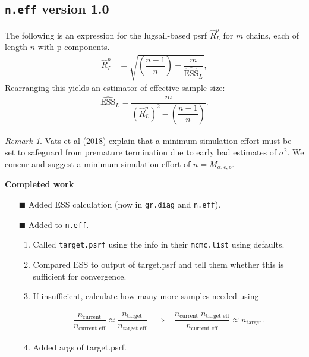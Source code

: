 \documentclass[12pt]{article}
\theoremstyle{remark}
\newtheorem{remark}{Remark}
\begin{document}
\subsection{\texttt{n.eff} version 1.0}

The following is an expression for the lugsail-based psrf $\hat{R}^p_L$ for $m$  chains, each of length $n$ with  p components.
\begin{align*}
	\hat{R}^p_L &= \sqrt{ \left(\dfrac{n-1}{n} \right) + \dfrac{m}{\widehat{\text{ESS}}_L}},
\end{align*}
Rearranging this yields an estimator of effective sample size:
\begin{align*}
\widehat{\text{ESS}}_L = \dfrac{m}{\left( \hat{R}^p_L \right)^2 -  \left(\dfrac{n-1}{n} \right)}.
\end{align*}

\begin{remark}
	\label{rem:minimum_effort}
Vats et al (2018) explain that a minimum simulation effort must be set to safeguard from premature termination due to early bad estimates of $\sigma^2$. We concur and  suggest  a minimum simulation effort of $n = M_{\alpha, \epsilon,p}$. \\
\end{remark}

\textbf{Completed work} %


\begin{itemize}
 \renewcommand{\labelitemi}{$\square$}
\item[$\blacksquare$]  Added ESS calculation (now in \texttt{gr.diag} and \texttt{n.eff}).
\item[$\blacksquare$]  Added to \texttt{n.eff}. 
\begin{enumerate}
\item Called \texttt{target.psrf} using the info in their \texttt{mcmc.list} using  defaults.
\item Compared ESS to output of target.psrf and tell them whether this is sufficient for convergence.
\item If insufficient, calculate how many more samples needed using


\begin{align*}
\dfrac{n_\text{current}}{n_{ \text{current eff}}} \approx \dfrac{n_{\text{target}}}{n_{ \text{target eff}}}
\;\;\;  \Longrightarrow \;\;\;
 \dfrac{n_{\text{current}} \; n_{ \text{target eff}}}{n_{ \text{current eff}}}  \approx n_{\text{target}}.
\end{align*}
\item Added args of target.psrf.
\end{enumerate}
\end{itemize}
\end{document}
